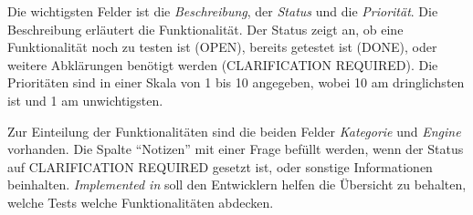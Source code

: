 Die wichtigsten Felder ist die \textit{Beschreibung}, der \textit{Status} und die \textit{Priorität}. Die Beschreibung erläutert die Funktionalität. Der Status zeigt an, ob eine Funktionalität noch zu testen ist (OPEN), bereits getestet ist (DONE), oder weitere Abklärungen benötigt werden (CLARIFICATION REQUIRED). Die Prioritäten sind in einer Skala von 1 bis 10 angegeben, wobei 10 am dringlichsten ist und 1 am unwichtigsten.

Zur Einteilung der Funktionalitäten sind die beiden Felder \textit{Kategorie} und \textit{Engine} vorhanden. Die Spalte "`Notizen"' mit einer Frage befüllt werden, wenn der Status auf CLARIFICATION REQUIRED gesetzt ist, oder sonstige Informationen beinhalten. \textit{Implemented in} soll den Entwicklern helfen die Übersicht zu behalten, welche Tests welche Funktionalitäten abdecken.















